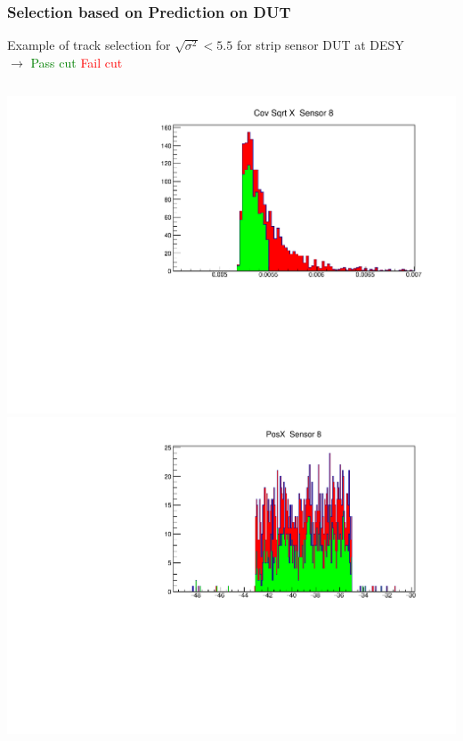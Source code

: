 \documentclass{beamer}
\begin{document}
\begin{frame}
\frametitle{Selection based on Prediction on DUT}
Example of track selection for $\sqrt{\sigma^{2}}<5.5$ for strip sensor DUT at DESY \\ $\rightarrow$ \textcolor{green}{Pass cut}  \textcolor{red}{Fail cut}
\begin{columns}[t]
\centering
\includegraphics[width=1\linewidth]{pics/covXCut-5_5Micron.pdf}\\
\includegraphics[width=1\linewidth]{pics/posX-Cut5_5MicronErr.pdf}\\
\centering

\end{columns}
\end{frame}
\end{document}
